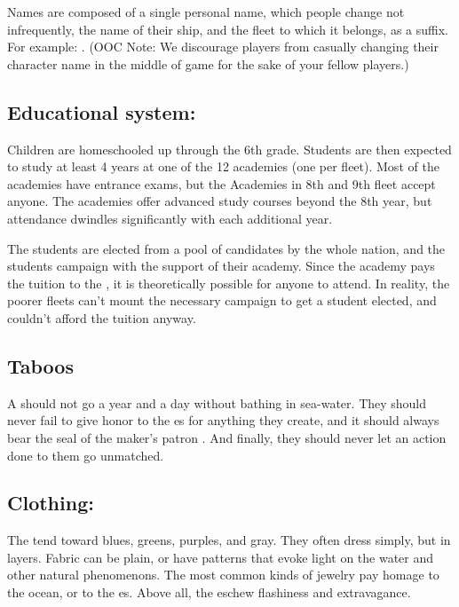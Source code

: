\documentclass[blue]{GL2020}
\begin{document}
Names are composed of a single personal name, which people change not infrequently, the name of their ship, and the fleet to which it belongs, as a suffix. For example: \cLoud{\full}. (OOC Note: We discourage players from casually changing their character name in the middle of game for the sake of your fellow players.)

\subsection{Educational system:}
Children are homeschooled up through the 6th grade. Students are then expected to study at least 4 years at one of the 12 academies (one per fleet). Most of the academies have entrance exams, but the Academies in 8th and 9th fleet accept anyone. The academies offer advanced study courses beyond the 8th year, but attendance dwindles significantly with each additional year.

The \pShip{} \pSchool{} students are elected from a pool of candidates by the whole nation, and the students campaign with the support of their academy. Since the academy pays the tuition to the \pSc{}, it is theoretically possible for anyone to attend. In reality, the poorer fleets can’t mount the necessary campaign to get a student elected, and couldn’t afford the tuition anyway.

\subsection*{Taboos}
A \pShippie{} should not go a year and a day without bathing in sea-water. They should never fail to give honor to the \cEbb{\God}es for anything they create, and it should always bear the seal of the maker’s patron \cEbb{\God}. And finally, they should never let an action done to them go unmatched.

\subsection{Clothing:}
The \pShip{} tend toward blues, greens, purples, and gray. They often dress simply, but in layers. Fabric can be plain, or have patterns that evoke light on the water and other natural phenomenons. The most common kinds of jewelry pay homage to the ocean, or to the \cEbb{\God}es. Above all, the \pShippies{} eschew flashiness and extravagance.
\end{document}
